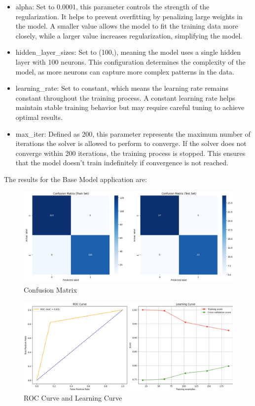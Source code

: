 \begin{itemize}
\item alpha: Set to 0.0001, this parameter controls the strength of the regularization. It helps to prevent overfitting by penalizing large weights in the model. A smaller value allows the model to fit the training data more closely, while a larger value increases regularization, simplifying the model.

\item hidden\_layer\_sizes: Set to (100,), meaning the model uses a single hidden layer with 100 neurons. This configuration determines the complexity of the model, as more neurons can capture more complex patterns in the data.

\item learning\_rate: Set to constant, which means the learning rate remains constant throughout the training process. A constant learning rate helps maintain stable training behavior but may require careful tuning to achieve optimal results.

\item max\_iter: Defined as 200, this parameter represents the maximum number of iterations the solver is allowed to perform to converge. If the solver does not converge within 200 iterations, the training process is stopped. This ensures that the model doesn't train indefinitely if convergence is not reached.

\end{itemize}

The results for the Base Model application are:

\begin{figure}[H]
    \centering
    \includegraphics[width=1\linewidth]{images/confusion_matrix_mlp_base.png}
    \caption{Confusion Matrix}
    \label{fig:enter-label}
\end{figure}
\begin{figure}[H]
    \centering
    \includegraphics[width=1\linewidth]{images/roc_learning_mlp_base.png}
    \caption{ROC Curve and Learning Curve}%
    \label{fig:enter-label}
\end{figure}

